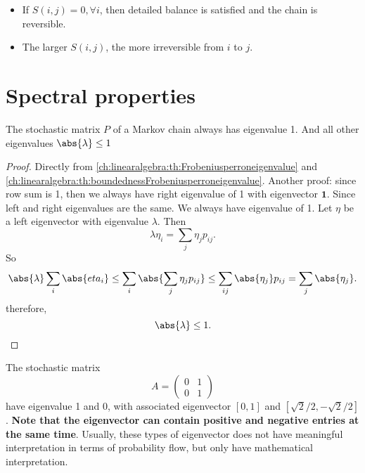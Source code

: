 \begin{refsection}
\begin{definition}
\end{definition}

\begin{remark}[interpretation]\hfill
\begin{itemize}
	\item If $S(i,j) =0, \forall i$, then detailed balance is satisfied and the chain is reversible.
	\item The larger $S(i,j)$, the more irreversible from $i$ to $j$.
\end{itemize}
\end{remark}



\section{Spectral properties}\label{ch:markov-chains:sec:spectral-properties}
\begin{lemma}
	The stochastic matrix $P$ of a Markov chain always has eigenvalue 1. And all other eigenvalues $\abs{\lambda} \leq 1$		
\end{lemma}
\begin{proof}
	Directly from \autoref{ch:linearalgebra:th:Frobeniusperroneigenvalue} and \autoref{ch:linearalgebra:th:boundednessFrobeniusperroneigenvalue}. Another proof: since row sum is 1, then we always have right eigenvalue of 1 with eigenvector $\bm{1}$. Since left and right eigenvalues are the same. We always have eigenvalue of 1. Let $\eta$ be a left eigenvector with eigenvalue $\lambda$. Then
	$$\lambda \eta_i = \sum_j \eta_j p_{ij}.$$
	So
	$$\abs{\lambda}\sum_i \abs{eta_i} \leq \sum_i\abs{\sum_j \eta_j p_{ij}} \leq \sum_{ij}\abs{\eta_j}p_{ij} = \sum_j \abs{\eta_j}.$$
	therefore, $$\abs{\lambda} \leq 1.$$
\end{proof}

\begin{example}
The stochastic matrix $$A = \begin{pmatrix}
0 & 1\\
0 & 1
\end{pmatrix}$$
have eigenvalue 1 and 0, with associated eigenvector $[0, 1]$ and $[\sqrt{2}/2, -\sqrt{2}/2]$. \textbf{Note that the eigenvector can contain positive and negative entries at the same time}. Usually, these types of eigenvector does not have meaningful interpretation in terms of probability flow, but only have mathematical interpretation.
\end{example}



\end{refsection}
